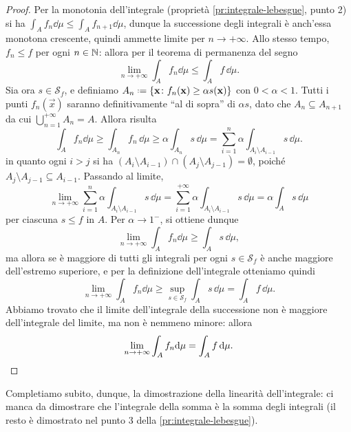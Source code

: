 \begin{proof}
	Per la monotonia dell'integrale (proprietà \ref{pr:integrale-lebesgue}, punto 2) si ha $\int_Af_n\dd\mu\leq\int_Af_{n+1}\dd\mu$, dunque la successione degli integrali è anch'essa monotona crescente, quindi ammette limite per $n\to+\infty$.
	Allo stesso tempo, $f_n\leq f$ per ogni $n\in\mathbb{N}$: allora per il teorema di permanenza del segno
	\begin{equation*}
		\lim_{n\to+\infty}\int_Af_n\dd\mu\leq\int_Af\,\dd\mu.
	\end{equation*}
	Sia ora $s\in\mathcal S_f$, e definiamo $A_n\defeq\{\vec x\colon f_n(\vec x)\geq \alpha s(\vec x)\}$ con $0<\alpha<1$.
	Tutti i punti $f_n(\vec x)$ saranno definitivamente ``al di sopra'' di $\alpha s$, dato che $A_n\subseteq A_{n+1}$ da cui $\bigcup_{n=1}^{+\infty}A_n=A$.
	Allora risulta
	\begin{equation}
		\int_Af_n\dd\mu\geq\int_{A_n}f_n\,\dd\mu\geq\alpha\int_{A_n}s\,\dd\mu=\sum_{i=1}^n\alpha\int_{A_i\setminus A_{i-1}}s\,\dd\mu.	
	\end{equation}
	in quanto ogni $i>j$ si ha $(A_i\setminus A_{i-1})\cap(A_j\setminus A_{j-1})=\emptyset$, poich\'e $A_j\setminus A_{j-1}\subseteq A_{i-1}$. Passando al limite,
	\begin{equation}
		\lim_{n\to+\infty}\sum_{i=1}^n\alpha\int_{A_i\setminus A_{i-1}}s\,\dd\mu=\sum_{i=1}^{+\infty}\alpha\int_{A_i\setminus A_{i-1}}s\,\dd\mu=\alpha\int_As\,\dd\mu
	\end{equation}
	per ciascuna $s\leq f$ in $A$.
	Per $\alpha\to 1^-$, si ottiene dunque
	\begin{equation}
		\lim_{n\to+\infty}\int_Af_n\dd\mu\geq\int_As\,\dd\mu,
	\end{equation}
	ma allora se è maggiore di tutti gli integrali per ogni $s\in\mathcal S_f$ è anche maggiore dell'estremo superiore, e per la definizione dell'integrale otteniamo quindi
	\begin{equation}
		\lim_{n\to+\infty}\int_Af_n\dd\mu\geq\sup_{s\in\mathcal S_f}\int_As\,\dd\mu=\int_Af\,\dd\mu.
	\end{equation}
	Abbiamo trovato che il limite dell'integrale della successione non è maggiore dell'integrale del limite, ma non è nemmeno minore: allora
	\begin{equation}
		\lim_{n\to+\infty}\int_Af_n\textup{d}\mu=\int_Af\,\textup{d}\mu.\qedhere
	\end{equation}
\end{proof}
Completiamo subito, dunque, la dimostrazione della linearità dell'integrale: ci manca da dimostrare che l'integrale della somma è la somma degli integrali (il resto è dimostrato nel punto 3 della \ref{pr:integrale-lebesgue}).
